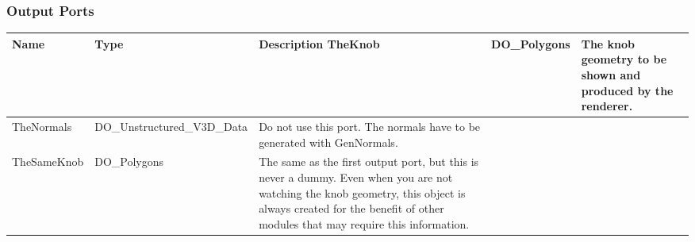 \begin{htmlonly}
\begin{longtable}{|p{2.5cm}|p{4.5cm}|p{7cm}|}
                    
														

\hline
\end{longtable}



%
\subsubsection{Output Ports}
%

 
\begin{longtable}{|p{2.5cm}|p{4.5cm}|p{7cm}|}
\hline
   \bf{Name} & \bf{Type} & \bf{Description} \endhead
\hline\hline
	\textcolor{required}{TheKnob} & DO\_Polygons & The knob geometry to be shown
                            and produced by the renderer.\\
\hline
	\textcolor{required}{TheNormals} & DO\_Unstructured\_V3D\_Data & Do not use this port.
                                 The normals have to be generated with GenNormals. \\
\hline
	\textcolor{required}{TheSameKnob} & DO\_Polygons & The same as the first output port,
                           but this is never a dummy. Even when you are not watching the
                           knob geometry, this object is always created for the benefit
                           of other modules that may require this information.\\
\hline
\end{longtable}



\end{htmlonly}
